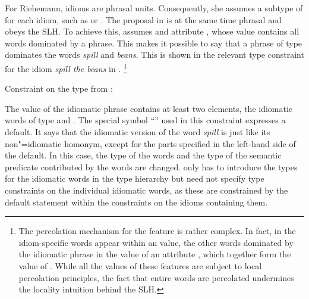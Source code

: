 \documentclass[output=paper]{langsci/langscibook}
\begin{document}
For Riehemann, idioms are phrasal units. 
Consequently, she assumes a subtype of  for each idiom, such as  or .
The proposal in \cite{Riehemann2001a} is at the same time phrasal and obeys the SLH. To achieve this, \cite{Riehemann2001a} assumes and attribute , whose value contains all words dominated by a phrase. This makes it possible to say that a phrase of type  dominates the words \emph{spill} and \emph{beans}. This is shown in the relevant type constraint for the idiom \emph{spill the beans} in .%
\footnote{The percolation mechanism for the feature  is rather complex. In fact, in \cite[Section 5.2.1]{Riehemann2001a} the idiom-specific words appear within an  value, the other words dominated by the idiomatic phrase in the value of an attribute , which together form the value of . While all the values of these features are subject to local percolation principles, the fact that entire words are percolated undermines the locality intuition behind the SLH.}


\vbox{
\ea Constraint on the type  from \citet[185]{Riehemann2001a}:\label{sr-spillbeans}\\
\z 
}

The  value of the idiomatic phrase contains at least two elements, the idiomatic words of type  and . 
The special symbol ``\srdefault'' used in this constraint expresses a default. It says that the idiomatic version of the word \emph{spill} is just like its non"=idiomatic homonym, except for the parts specified in the left-hand side of the default. 
In this case, the type of the words and the type of the semantic predicate contributed by the words are changed. 
\cite{Riehemann2001a} only has to introduce the types for the idiomatic words in the type hierarchy but need not specify type constraints on the individual idiomatic words, as these are constrained by the default statement within the constraints on the idioms containing them.
\end{document}
